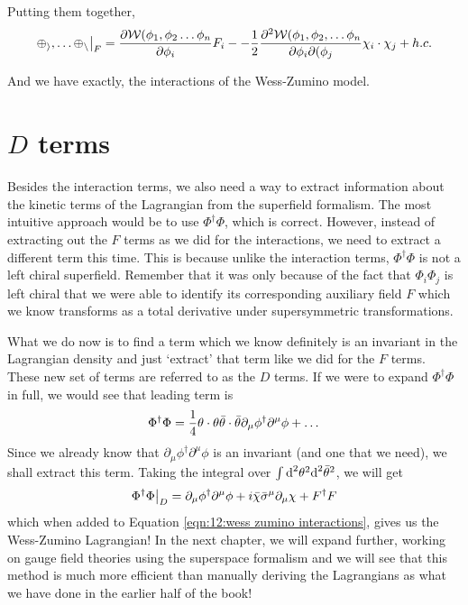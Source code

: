 Putting them together, 
\begin{equation}
    \mathcal{\Phi_i, \dots \Phi_n}\big\vert_F = \diff{\mathcal{W}(\phi_1, \phi_2 \dots \phi_n}{\phi_i} F_i - -\frac{1}{2} \diff{^2\mathcal{W}(\phi_1, \phi_2, \dots \phi_n}{\phi_i \partial( \phi_j} \chi_i \cdot \chi_j + h.c.
    \label{eqn:12:wess zumino interactions}
\end{equation}

And we have exactly, the interactions of the Wess-Zumino model.

\section{$D$ terms}
\label{ch:12:d terms}
Besides the interaction terms, we also need a way to extract information about the kinetic terms of the Lagrangian from the superfield formalism. The most intuitive approach would be to use $\Phi^\dagger \Phi$, which is correct. However, instead of extracting out the $F$ terms as we did for the interactions, we need to extract a different term this time. This is because unlike the interaction terms, $\Phi^\dagger \Phi$ is not a left chiral superfield. Remember that it was only because of the fact that $\Phi_i\Phi_j$ is left chiral that we were able to identify its corresponding auxiliary field $F$ which we know transforms as a total derivative under supersymmetric transformations.

What we do now is to find a term which we know definitely is an invariant in the Lagrangian density and just `extract' that term like we did for the $F$ terms. These new set of terms are referred to as the $D$ terms. If we were to expand $\Phi^\dagger\Phi$ in full, we would see that leading term is
\begin{equation}
    \Phi^\dagger\Phi = \frac{1}{4} \theta \cdot \theta \Bar{\theta} \cdot \Bar{\theta} \partial_\mu \phi^\dagger \partial^\mu \phi + \dots
\end{equation}
Since we already know that $\partial_\mu \phi^\dagger \partial^\mu \phi$ is an invariant (and one that we need), we shall extract this term. Taking the integral over $\int \text{d}^2 \theta^2 \text{d}^2 \Bar{\theta}^2$, we will get
\begin{equation}
    \Phi^\dagger \Phi\big\vert_D = \partial_\mu \phi^\dagger \partial^\mu \phi + i \Bar{\chi} \Bar{\sigma}^\mu \partial_\mu \chi + F^\dagger F
\end{equation}
which when added to Equation \ref{eqn:12:wess zumino interactions}, gives us the Wess-Zumino Lagrangian! In the next chapter, we will expand further, working on gauge field theories using the superspace formalism and we will see that this method is much more efficient than manually deriving the Lagrangians as what we have done in the earlier half of the book!